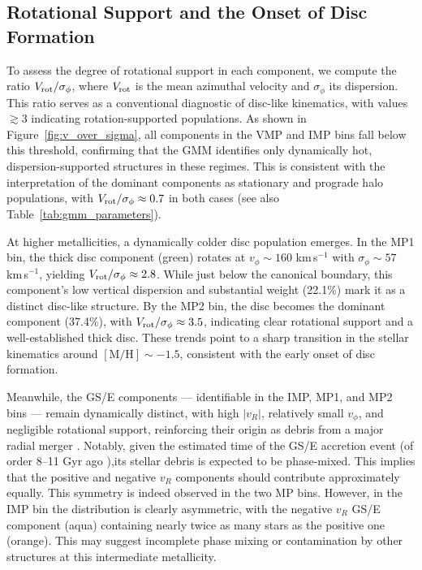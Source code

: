 \documentclass[a4paper,12pt]{article}
\begin{document}
\subsection{Rotational Support and the Onset of Disc Formation}

To assess the degree of rotational support in each component, we compute the ratio 
$V_{\rm rot} / \sigma_\phi$, where $V_{\rm rot}$ is the mean azimuthal velocity and 
$\sigma_\phi$ its dispersion. This ratio serves as a conventional diagnostic of disc-like 
kinematics, with values $\gtrsim 3$ indicating rotation-supported populations. As shown in 
Figure~\ref{fig:v_over_sigma}, all components in the VMP and IMP bins fall below this threshold, 
confirming that the GMM identifies only dynamically hot, dispersion-supported structures in these 
regimes. This is consistent with the interpretation of the dominant components as stationary and 
prograde halo populations, with $V_{\rm rot} / \sigma_\phi \approx 0.7$ in both cases (see also 
Table~\ref{tab:gmm_parameters}).

At higher metallicities, a dynamically colder disc population emerges. In the MP1 bin, the thick 
disc component (green) rotates at $v_\phi \sim 160$ km\,s$^{-1}$ with $\sigma_\phi \sim 57$ km\,s$^{-1}$, 
yielding $V_{\rm rot} / \sigma_\phi \approx 2.8$. While just below the canonical boundary, this 
component’s low vertical dispersion and substantial weight (22.1\%) mark it as a distinct disc-like 
structure. By the MP2 bin, the disc becomes the dominant component (37.4\%), with 
$V_{\rm rot} / \sigma_\phi \approx 3.5$, indicating clear rotational support and a well-established 
thick disc. These trends point to a sharp transition in the stellar kinematics around 
$\mathrm{[M/H]} \sim -1.5$, consistent with the early onset of disc formation.

Meanwhile, the GS/E components — identifiable in the IMP, MP1, and MP2 bins — remain dynamically 
distinct, with high $|v_R|$, relatively small $v_\phi$, and negligible rotational support, reinforcing 
their origin as debris from a major radial merger \citep{Helmi2018}. Notably, given 
the estimated time of the GS/E accretion event (of order 8–11 Gyr ago \citep{Gallart2019,Belokurov2020,DiMatteo2019}),its stellar 
debris is expected to be phase-mixed. This 
implies that the positive and negative $v_R$ components should contribute approximately equally. 
This symmetry is indeed observed in the two MP bins. However, in the IMP bin the distribution is 
clearly asymmetric, with the negative $v_R$ GS/E component (aqua) containing nearly twice as many 
stars as the positive one (orange). This may suggest incomplete phase mixing or contamination by 
other structures at this intermediate metallicity.
\end{document}
